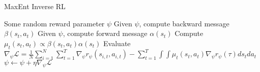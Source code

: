 \begin{algorithm}[t!]
\caption{MaxEnt Inverse RL}
\begin{algorithmic}[1]
\label{alg:maxent}
\REQUIRE Some random reward parameter $\psi$
\STATE Given $\psi$, compute backward message $\beta(s_t,a_t)$
\STATE Given $\psi$, compute forward message $\alpha(s_t)$
\STATE Compute $\mu_t(s_t,a_t)\propto \beta(s_t,a_t)\alpha(s_t)$
\STATE Evaluate $\nabla_{\psi}\mathcal{L} = \frac{1}{N}\sum_{i=1}^N\sum_{t=1}^T\nabla_\psi r_\psi(s_{i,t},a_{i,t}) -\sum_{t=1}^T\int \int \mu_t(s_t,a_t)\nabla_\psi r_\psi(\tau)ds_tda_t$
\STATE $\psi \leftarrow \psi + \eta\nabla_\psi\mathcal{L}$
\ENDWHILE
\end{algorithmic}
\end{algorithm}